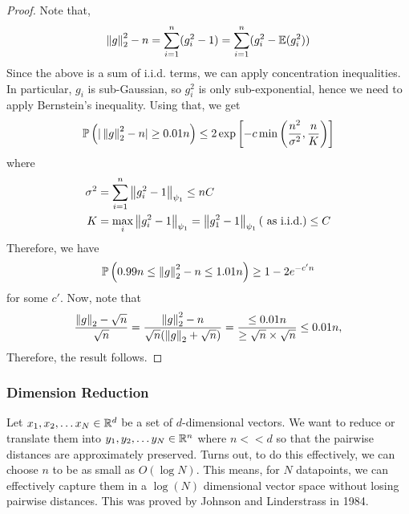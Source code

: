 \documentclass[12pt]{article}
\begin{document}
\begin{proof}
    Note that,
    \begin{equation*}
        \left\Vert g \right\Vert_2^2 - n
        = \sum_{i=1}^n (g_i^2 - 1)
        = \sum_{i=1}^n (g_i^2 - \mathbb{E}(g_i^2))
    \end{equation*}
    \noindent Since the above is a sum of i.i.d. terms, we can apply concentration inequalities. In particular, $g_i$ is sub-Gaussian, so $g_i^2$ is only sub-exponential, hence we need to apply Bernstein's inequality. Using that, we get
    \begin{equation*}
        \mathbb{P}\left( \vert \left\Vert g \right\Vert_2^2 - n\vert \geq 0.01n \right) \leq 2 \exp\left[ - c\min\left( \dfrac{n^2}{\sigma^2}, \dfrac{n}{K} \right) \right]
    \end{equation*}
    \noindent where
    \begin{align*}
        \sigma^2 & = \sum_{i=1}^n \left\Vert g_i^2 - 1 \right\Vert_{\psi_1} \leq nC                                            \\
        K        & = \max_{i} \left\Vert g_i^2 - 1 \right\Vert_{\psi_1} = \left\Vert g_1^2 - 1 \right\Vert_{\psi_1} (\text{ as i.i.d.}) \leq C
    \end{align*}
    \noindent Therefore, we have
    \begin{equation*}
        \mathbb{P}\left( 0.99n \leq \left\Vert g \right\Vert_2^2 - n \leq 1.01n \right) \geq 1 - 2e^{-c' n}
    \end{equation*}
    \noindent for some $c'$. Now, note that
    \begin{equation*}
        \dfrac{\left\Vert g \right\Vert_2 - \sqrt{n}}{\sqrt{n}} = \dfrac{\left\Vert g \right\Vert_2^2 - n}{\sqrt{n}(\left\Vert g \right\Vert_2 + \sqrt{n})} = \dfrac{\leq 0.01n}{\geq \sqrt{n} \times \sqrt{n}} \leq 0.01n,
    \end{equation*}
    \noindent Therefore, the result follows.
\end{proof}

\subsubsection{Dimension Reduction}

Let $x_1, x_2, \dots x_N \in \mathbb{R}^d$ be a set of $d$-dimensional vectors. We want to reduce or translate them into $y_1, y_2, \dots y_N \in \mathbb{R}^n$ where $n << d$ so that the pairwise distances are approximately preserved. Turns out, to do this effectively, we can choose $n$ to be as small as $O(\log N)$. This means, for $N$ datapoints, we can effectively capture them in a $\log(N)$ dimensional vector space without losing pairwise distances. This was proved by Johnson and Linderstrass in 1984.
\end{document}
